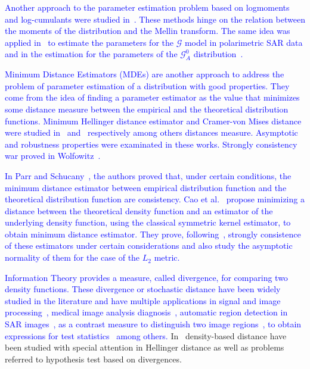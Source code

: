 \documentclass[technote,onecolumn,draftcls,12pt]{IEEEtran}
\numberwithin{equation}{section}
\begin{document}
\textcolor{blue}{Another approach to the parameter estimation problem based on logmoments and log-cumulants were studied in~\cite{nicolas2002}. 
These methods hinge on the relation between the moments of the distribution and the Mellin transform. 
The same idea was applied in~\cite{khan2014} to estimate the parameters for the $\mathcal{G}$ model in polarimetric SAR data and in the estimation for the parameters of the $\mathcal G_A^0$ distribution~\cite{Tison2004}. }

\textcolor{blue}{Minimum Distance Estimators (MDEs) are another approach to address the problem of parameter estimation of a distribution with good properties.
They come from the idea of finding a parameter estimator as the value that minimizes some  distance measure between the empirical and the  theoretical distribution functions.
Minimum Hellinger distance estimator and Cramer-von Mises distance were studied in~\cite{beran1977} and~\cite{Boos1981} respectively among others distances measure. Asymptotic and robustness properties were examinated in these works. Strongly consistency war proved in Wolfowitz~\cite{wolfowitz1953,wolfowitz1957}.}

\textcolor{blue}{In Parr and Schucany~\cite{parr1982}, the authors proved that, under certain conditions, the minimum distance estimator between empirical distribution function and the theoretical distribution function are consistency. Cao et al.~\cite{cao1995minimum} propose minimizing a distance between the theoretical density function and an estimator of the underlying density function, using the classical symmetric kernel estimator,  to obtain minimum distance estimator. They prove, following~\cite{parr1982}, strongly consistence of these estimators under certain considerations and also study the asymptotic normality of them for the case of the $L_2$ metric.}


\textcolor{blue}{Information Theory provides a measure, called divergence, for comparing two density functions. These divergence or stochastic distance have been widely studied in the literature and have multiple applications in signal and image processing~\cite{4218961}, medical image analysis diagnosis~\cite{5599869}, automatic region detection in SAR images~\cite{EdgeDetectionDistancesEntropiesJSTARS,SARSegmentationLevelSetGA0}, as a contrast measure to distinguish two image regions~\cite{Nascimento2009}, to obtain expressions for test statistics~\cite{ClassificationPolSARSegmentsMinimizationWishartDistances} among others.}
In~\cite{Basu2011} density-based distance have been studied with special attention in Hellinger distance as well as problems referred to hypothesis test based on divergences.
\end{document}
